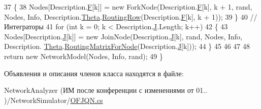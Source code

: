 \begin{DoxyCode}
37             \{
38                 Nodes[Description.\hyperlink{class_network_descriptions_1_1_description_o_f_j_q_n_aaadbe1cc3f0bdb0bef593d2b732c988f}{F}[k]] = \textcolor{keyword}{new} ForkNode(Description.\hyperlink{class_network_descriptions_1_1_description_o_f_j_q_n_aaadbe1cc3f0bdb0bef593d2b732c988f}{F}[k], k + 1, rand, Nodes, Info, 
      Description.\hyperlink{class_network_descriptions_1_1_description_o_f_j_q_n_af8d4bf8f19a4db2daef14d0dafd77a00}{Theta}.\hyperlink{class_network_descriptions_1_1_routing_matrix_aab9481fcca1c6b37fbe29f32cdf3dc83}{RoutingRow}(Description.\hyperlink{class_network_descriptions_1_1_description_o_f_j_q_n_aaadbe1cc3f0bdb0bef593d2b732c988f}{F}[k], k + 1));
39             \}
40             \textcolor{comment}{//Интеграторы}
41             \textcolor{keywordflow}{for} (\textcolor{keywordtype}{int} k = 0; k < Description.\hyperlink{class_network_descriptions_1_1_description_o_f_j_q_n_a75cf16b40e07c708c6580d331e692de0}{J}.Length; k++)
42             \{
43                 Nodes[Description.\hyperlink{class_network_descriptions_1_1_description_o_f_j_q_n_a75cf16b40e07c708c6580d331e692de0}{J}[k]] = \textcolor{keyword}{new} JoinNode(Description.\hyperlink{class_network_descriptions_1_1_description_o_f_j_q_n_a75cf16b40e07c708c6580d331e692de0}{J}[k], rand, Nodes, Info, Description.
      \hyperlink{class_network_descriptions_1_1_description_o_f_j_q_n_af8d4bf8f19a4db2daef14d0dafd77a00}{Theta}.\hyperlink{class_network_descriptions_1_1_routing_matrix_ac861d6d51c5507ca96cca4cf29b4a02c}{RoutingMatrixForNode}(Description.\hyperlink{class_network_descriptions_1_1_description_o_f_j_q_n_a75cf16b40e07c708c6580d331e692de0}{J}[k]));
44             \}
45 
46 
47 
48             \textcolor{keywordflow}{return} \textcolor{keyword}{new} NetworkModel(Nodes, Info, rand); 
49         \}
\end{DoxyCode}


Объявления и описания членов класса находятся в файле\+:\begin{DoxyCompactItemize}
\item 
Network\+Analyzer (ИМ после конференции  с изменениями от 01.. )/\+Network\+Simulator/\hyperlink{_o_f_j_q_n_8cs}{O\+F\+J\+Q\+N.\+cs}\end{DoxyCompactItemize}
